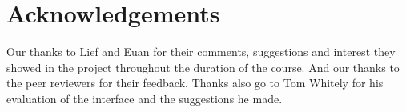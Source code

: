 \documentclass{sig-alt-release2}
\begin{document}
\section{Acknowledgements}
Our thanks to Lief and Euan for their comments, suggestions and interest they showed in the project throughout the duration of the course. And our thanks to the peer reviewers for their feedback.
Thanks also go to Tom Whitely for his evaluation of the interface and the suggestions he made.



\end{document}
